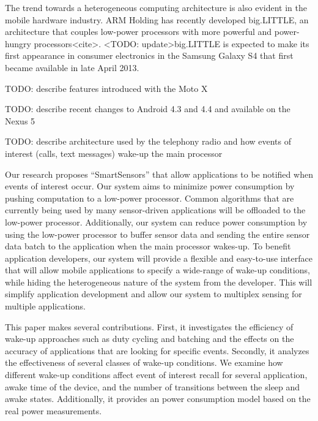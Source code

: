 The trend towards a heterogeneous computing architecture is also evident in the mobile hardware
industry. ARM Holding has recently developed big.LITTLE, an architecture that couples low-power
processors with more powerful and power-hungry processors<cite>. <TODO: update>big.LITTLE is expected to
make its first appearance in consumer electronics in the Samsung Galaxy S4 that first became available
in late April 2013. 

TODO: describe features introduced with the Moto X

TODO: describe recent changes to Android 4.3 and 4.4 and available on the Nexus 5

TODO: describe architecture used by the telephony radio and how events of interest (calls, text messages) wake-up the main processor 

Our research proposes “SmartSensors” that allow applications to be notified when events of interest
occur. Our system aims to minimize power consumption by pushing computation to a low-power
processor. Common algorithms that are currently being used by many sensor-driven applications will be
offloaded to the low-power processor. Additionally, our system can reduce power consumption by using
the low-power processor to buffer sensor data and sending the entire sensor data batch to the
application when the main processor wakes-up. To benefit application developers, our system will
provide a flexible and easy-to-use interface that will allow mobile applications to specify a wide-range of
wake-up conditions, while hiding the heterogeneous nature of the system from the developer. This will
simplify application development and allow our system to multiplex sensing for multiple applications.

This paper makes several contributions. First, it investigates the efficiency of wake-up approaches such as duty cycling and batching and the effects on the accuracy of applications that are looking for specific events. Secondly, it analyzes the effectiveness of several classes of wake-up conditions. We examine how different wake-up
conditions affect event of interest recall for several application, awake time of the device, and the number of 
transitions between the sleep and awake states. Additionally, it provides an power consumption model based
on the real power measurements.